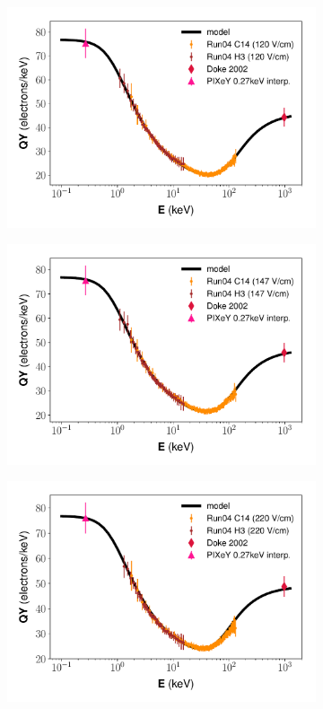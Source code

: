 \begin{figure}[!h]
\centering
\begin{subfigure}{0.5\linewidth}
\includegraphics[width=\linewidth]{Figures/Yields_fit_new/NEST_fit_120Vcm_new.pdf}
\caption{}
\end{subfigure}%
\begin{subfigure}{0.5\linewidth}
\includegraphics[width=\linewidth]{Figures/Yields_fit_new/NEST_fit_147Vcm_new.pdf}
\caption{}
\end{subfigure}
\begin{subfigure}{0.5\linewidth}
\includegraphics[width=\linewidth]{Figures/Yields_fit_new/NEST_fit_220Vcm_new.pdf}

\end{subfigure}
\end{figure}
